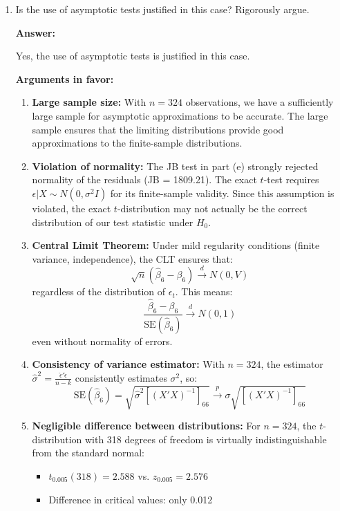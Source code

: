 \documentclass[12pt,a4paper]{article}
\begin{document}
\begin{enumerate}[label=(\alph*)]
  \item Is the use of asymptotic tests justified in this case? Rigorously argue.
  
  \textbf{Answer:} 

  Yes, the use of asymptotic tests is justified in this case.

\textbf{Arguments in favor:}

\begin{enumerate}
\item \textbf{Large sample size:} With $n = 324$ observations, 
we have a sufficiently large sample for asymptotic approximations 
to be accurate. The large sample ensures that the limiting 
distributions provide good approximations to the finite-sample 
distributions.

\item \textbf{Violation of normality:} The JB test in part (e) 
strongly rejected normality of the residuals (JB = 1809.21). 
The exact $t$-test requires $\epsilon | X \sim N(0, \sigma^2 I)$ 
for its finite-sample validity. Since this assumption is violated, 
the exact $t$-distribution may not actually be the correct 
distribution of our test statistic under $H_0$.

\item \textbf{Central Limit Theorem:} Under mild regularity 
conditions (finite variance, independence), the CLT ensures that:
$$\sqrt{n}(\hat{\beta}_6 - \beta_6) \xrightarrow{d} N(0, V)$$
regardless of the distribution of $\epsilon_t$. This means:
$$\frac{\hat{\beta}_6 - \beta_6}{\text{SE}(\hat{\beta}_6)} 
\xrightarrow{d} N(0,1)$$
even without normality of errors.

\item \textbf{Consistency of variance estimator:} With $n = 324$, 
the estimator $\hat{\sigma}^2 = \frac{\hat{\epsilon}'\hat{\epsilon}}{n-k}$ 
consistently estimates $\sigma^2$, so:
$$\text{SE}(\hat{\beta}_6) = 
\sqrt{\hat{\sigma}^2[(X'X)^{-1}]_{66}} 
\xrightarrow{p} \sigma\sqrt{[(X'X)^{-1}]_{66}}$$

\item \textbf{Negligible difference between distributions:} 
For $n = 324$, the $t$-distribution with 318 degrees of freedom 
is virtually indistinguishable from the standard normal:
\begin{itemize}
\item $t_{0.005}(318) = 2.588$ vs. $z_{0.005} = 2.576$
\item Difference in critical values: only 0.012
\end{itemize}


\end{enumerate}
\end{enumerate}
\end{document}
